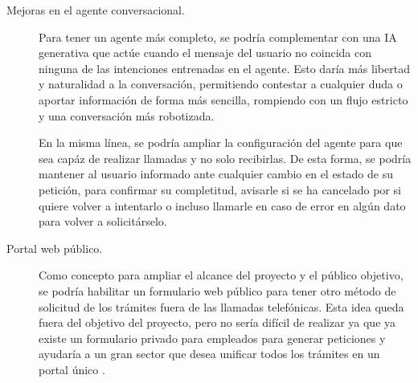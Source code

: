 \begin{description}
        \item[Mejoras en el agente conversacional.] Para tener un agente más completo, se podría complementar con una IA generativa que actúe cuando el mensaje del usuario no coincida con ninguna de las intenciones entrenadas en el agente. 
            Esto daría más libertad y naturalidad a la conversación, permitiendo contestar a cualquier duda o aportar información de forma más sencilla, rompiendo con un flujo estricto y una conversación más robotizada. 
            
            En la misma línea, se podría ampliar la configuración del agente para que sea capáz de realizar llamadas y no solo recibirlas. 
            De esta forma, se podría mantener al usuario informado ante cualquier cambio en el estado de su petición, para confirmar su completitud, avisarle si se ha cancelado por si quiere volver a intentarlo o incluso llamarle en caso de error en algún dato para volver a solicitárselo. 
        
        \item[Portal web público.] Como concepto para ampliar el alcance del proyecto y el público objetivo, se podría habilitar un formulario web público para tener otro método de solicitud de los trámites fuera de las llamadas telefónicas. 
            Esta idea queda fuera del objetivo del proyecto, pero no sería difícil de realizar ya que ya existe un formulario privado para empleados para generar peticiones y ayudaría a un gran sector que desea unificar todos los trámites en un portal único \cite{ref4}. 
    \end{description}


